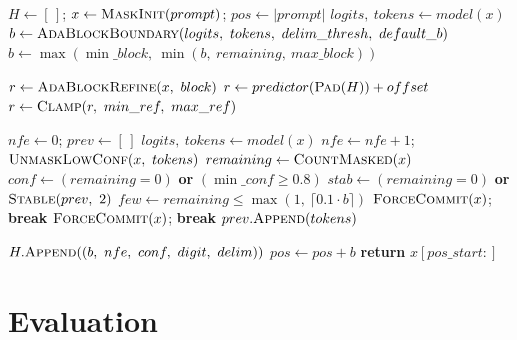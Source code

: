 \documentclass[11pt]{article}
\begin{document}
\begin{algorithm}[t!]
  \small
  \caption{Per-block PAG decoding with AdaBlock boundaries and soft-cap refinement.}
  \label{alg:scheduler}
  \begin{algorithmic}[1]
      \State $H \gets [\,]$; $x \gets \textsc{MaskInit}(prompt)$; $pos \gets |prompt|$
        \State $logits,\ tokens \gets model(x)$
        \State $b \gets \textsc{AdaBlockBoundary}(logits,\ tokens,\ delim\_thresh,\ default\_b)$
        \State $b \gets \max(\min\_block,\ \min(b,\ remaining,\ max\_block))$

          \State $r \gets \textsc{AdaBlockRefine}(x,\ block)$ 
        \Else
          \State $r \gets predictor(\textsc{Pad}(H)) + offset$
        \EndIf
        \State $r \gets \textsc{Clamp}(r,\ min\_ref,\ max\_ref)$

        \State $nfe \gets 0$; $prev \gets [\,]$
        \While{$\exists\ masked\ token\ in\ [pos,\ pos+b)$}
          \State $logits,\ tokens \gets model(x)$
          \State $nfe \gets nfe + 1$; $\textsc{UnmaskLowConf}(x,\ tokens)$
            \State $remaining \gets \textsc{CountMasked}(x)$
            \State $conf \gets (remaining = 0)$ \textbf{or} $(\min\_conf \ge 0.8)$
            \State $stab \gets (remaining = 0)$ \textbf{or} $\textsc{Stable}(prev,\ 2)$
            \State $few \gets remaining \le \max(1,\ \lceil 0.1 \cdot b \rceil)$
              \State $\textsc{ForceCommit}(x)$; \textbf{break}
            \EndIf
          \EndIf
            \State $\textsc{ForceCommit}(x)$; \textbf{break} 
          \EndIf
          \State $prev.\textsc{Append}(tokens)$
        \EndWhile

        \State $H.\textsc{Append}((b,\ nfe,\ conf,\ digit,\ delim))$
        \State $pos \gets pos + b$
      \EndWhile
      \State \textbf{return} $x[pos\_start\!:]$
    \EndProcedure
  \end{algorithmic}
\end{algorithm}
\section{Evaluation}
\end{document}
